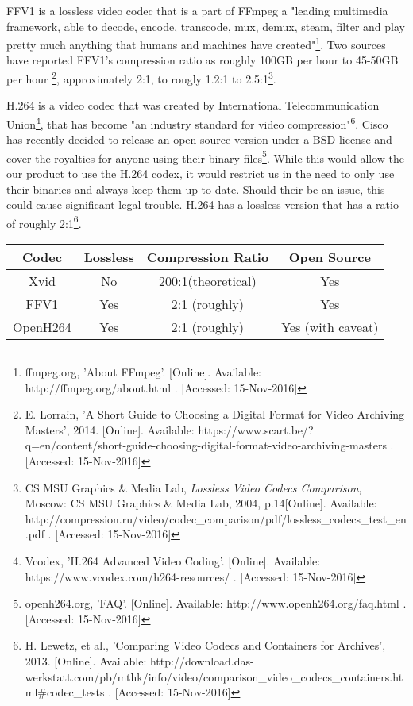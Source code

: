 \documentclass[letterpaper,10pt,onecolumn,draftclsnofoot]{IEEEtran}
\begin{document}
FFV1 is a lossless video codec that is a part of FFmpeg a "leading multimedia framework, able to decode, encode, transcode, mux, demux, steam, filter and play pretty much anything that humans and machines have created"\footnote{ffmpeg.org, 'About FFmpeg'. [Online]. Available: http://ffmpeg.org/about.html . [Accessed: 15-Nov-2016] }. %
Two sources have reported FFV1's compression ratio as roughly 100GB per hour to 45-50GB per hour \footnote{E. Lorrain, 'A Short Guide to Choosing a Digital Format for Video Archiving Masters', 2014. [Online]. Available: https://www.scart.be/?q=en/content/short-guide-choosing-digital-format-video-archiving-masters . [Accessed: 15-Nov-2016] }, approximately 2:1, to rougly 1.2:1 to 2.5:1\footnote{CS MSU Graphics \& Media Lab, \textit{Lossless Video Codecs Comparison}, Moscow: CS MSU Graphics \& Media Lab, 2004, p.14[Online]. Available: http://compression.ru/video/codec\_comparison/pdf/lossless\_codecs\_test\_en.pdf . [Accessed: 15-Nov-2016] }. %

H.264 is a video codec that was created by International Telecommunication Union\footnote{Vcodex, 'H.264 Advanced Video Coding'. [Online]. Available: https://www.vcodex.com/h264-resources/ . [Accessed: 15-Nov-2016] }, that has become "an industry standard for video compression"\textsuperscript{6}. %
Cisco has recently decided to release an open source version under a BSD license and cover the royalties for anyone using their binary files\footnote{openh264.org, 'FAQ'. [Online]. Available: http://www.openh264.org/faq.html . [Accessed: 15-Nov-2016] }. %
While this would allow the our product to use the H.264 codex, it would restrict us in the need to only use their binaries and always keep them up to date.
Should their be an issue, this could cause significant legal trouble.
H.264 has a lossless version that has a ratio of roughly 2:1\footnote{H. Lewetz, et al., 'Comparing Video Codecs and Containers for Archives', 2013. [Online]. Available: http://download.das-werkstatt.com/pb/mthk/info/video/comparison\_video\_codecs\_containers.html\#codec\_tests . [Accessed: 15-Nov-2016] }. %

\begin{tabular}{|c|c|c|c|}
	\hline
	\textbf{Codec} & \textbf{Lossless} & \textbf{Compression Ratio} & \textbf{Open Source} \\
	\hline
	Xvid & No & 200:1(theoretical) & Yes \\
	\hline
	FFV1 & Yes & 2:1 (roughly) & Yes \\
	\hline
	 OpenH264 & Yes & 2:1 (roughly) & Yes (with caveat) \\
	\hline
	
\end{tabular}
\end{document}
